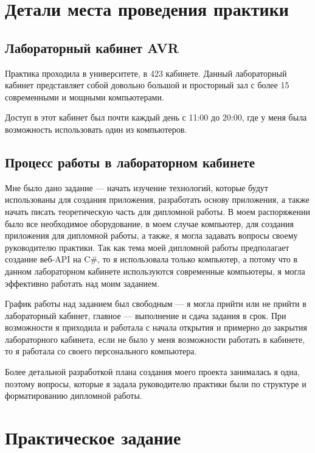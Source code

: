 \documentclass[a4paper,12pt]{report}
\begin{document}
\chapter{Детали места проведения практики}

\section{Лабораторный кабинет AVR}

Практика проходила в университете, в 423 кабинете.
Данный лабораторный кабинет представляет собой довольно большой и просторный зал с более 15 современными и мощными компьютерами.

Доступ в этот кабинет был почти каждый день с 11:00 до 20:00, где у меня была возможность использовать один из компьютеров.

\section{Процесс работы в лабораторном кабинете}

Мне было дано задание --- начать изучение технологий, которые будут использованы для создания приложения, разработать основу приложения, 
а также начать писать теоретическую часть для дипломной работы.
В моем распоряжении было все необходимое оборудование, в моем случае компьютер, для создания приложения для дипломной работы, 
а также, я могла задавать вопросы своему руководителю практики. Так как тема моей дипломной работы предполагает создание веб-\ac{API} на C\#, 
то я использовала только компьютер, а потому что в данном лабораторном кабинете используются современные компьютеры, 
я могла эффективно работать над моим заданием. 

График работы над заданием был свободным --- я могла прийти или не прийти в лабораторный кабинет, главное --- выполнение и сдача задания в срок.
При возможности я приходила и работала с начала открытия и примерно до закрытия лабораторного кабинета, если не было у меня возможности работать в кабинете, 
то я работала со своего персонального компьютера.

Более детальной разработкой плана создания моего проекта занималась я одна, поэтому вопросы, которые я задала руководителю практики были по 
структуре и форматированию дипломной работы.

\chapter{Практическое задание}
\end{document}
